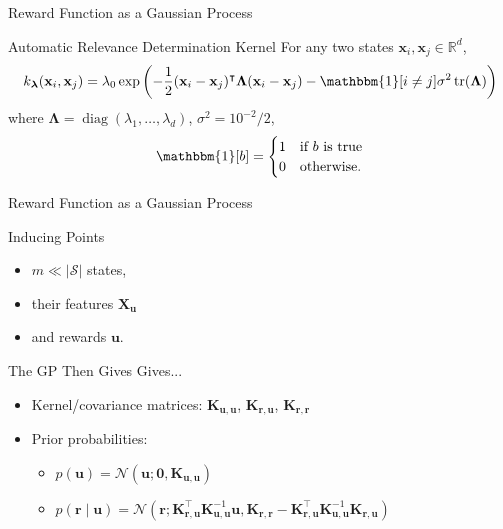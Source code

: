 \documentclass{beamer}
\DeclareMathOperator{\diag}{diag}
\DeclareMathOperator{\tr}{tr}
\newcommand{\Kuu}{\mathbf{K}_{\mathbf{u},\mathbf{u}}}
\newcommand{\Krr}{\mathbf{K}_{\mathbf{r},\mathbf{r}}}
\newcommand{\Kru}{\mathbf{K}_{\mathbf{r},\mathbf{u}}}
\begin{document}
\begin{frame}{Reward Function as a Gaussian Process}
  \begin{block}{Automatic Relevance Determination Kernel}
    For any two states $\mathbf{x}_i, \mathbf{x}_j \in \mathbb{R}^d$,
    \[
      k_{\bm\lambda}(\mathbf{x}_i, \mathbf{x}_j) = \lambda_0\exp\left(
        -\frac{1}{2}(\mathbf{x}_i - \mathbf{x}_j)^\intercal\bm\Lambda(\mathbf{x}_i -
        \mathbf{x}_j) - \mathbbm{1}[i \ne j]\sigma^2\tr(\bm\Lambda) \right)
    \]
    where $\bm\Lambda = \diag(\lambda_1, \dots, \lambda_d)$, $\sigma^2 =
    10^{-2}/2$,
    \[
      \mathbbm{1}[b] = \begin{cases}
        1 & \mbox{if $b$ is true} \\
        0 & \mbox{otherwise}.
      \end{cases}
    \]
  \end{block}
\end{frame}

\begin{frame}{Reward Function as a Gaussian Process}
    \begin{block}{Inducing Points}
      \begin{itemize}
      \item $m \ll |\mathcal{S}|$ states,
      \item their features $\mathbf{X_u}$
      \item and rewards $\mathbf{u}$.
      \end{itemize}
    \end{block}

  \begin{block}{The GP Then Gives Gives...}
    \begin{itemize}
    \item Kernel/covariance matrices: $\Kuu$, $\Kru$, $\Krr$
    \item Prior probabilities:
      \begin{itemize}
      \item $p(\mathbf{u}) = \mathcal{N}(\mathbf{u}; \mathbf{0}, \Kuu)$
      \item $p(\mathbf{r} \mid \mathbf{u}) = \mathcal{N}(\mathbf{r};
        \Kru^\intercal\Kuu^{-1}\mathbf{u}, \Krr - \Kru^\intercal\Kuu^{-1}\Kru)$
      \end{itemize}
    \end{itemize}
  \end{block}
\end{frame}
\end{document}
